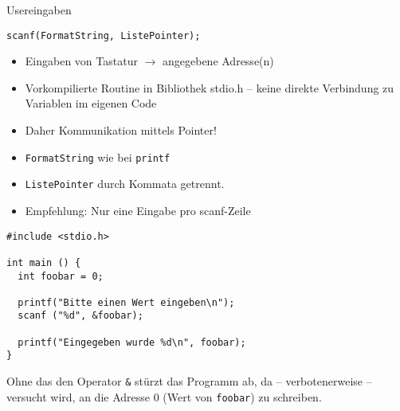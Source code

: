 
\begin{frame}{Usereingaben}
%
\begin{codebox}[Syntax]
\texttt{scanf(FormatString, ListePointer);}
\end{codebox}
\begin{itemize}
\item Eingaben von Tastatur $\rightarrow$ angegebene Adresse(n)
\item Vorkompilierte Routine in Bibliothek stdio.h -- 
	keine direkte Verbindung zu Variablen im eigenen Code
\item Daher Kommunikation mittels Pointer!
\item \texttt{FormatString} wie bei \texttt{printf}
\item \texttt{ListePointer} durch Kommata getrennt.
\item Empfehlung: Nur eine Eingabe pro scanf-Zeile
\end{itemize}
%
\end{frame}


\begin{frame}[fragile]%
%
\begin{codebox}
\begin{verbatim}
#include <stdio.h>

int main () {
  int foobar = 0;
  
  printf("Bitte einen Wert eingeben\n");
  scanf ("%d", &foobar);
  
  printf("Eingegeben wurde %d\n", foobar);
}
\end{verbatim}
\end{codebox}
%
\begin{warnbox}
\small Ohne das den Operator \texttt{&} stürzt das Programm ab, da -- verbotenerweise -- versucht wird, an die Adresse 0 (Wert von \texttt{foobar}) zu schreiben.
\end{warnbox}
%
\end{frame}


